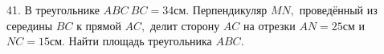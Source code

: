 41. В треугольнике $ABC\ BC=34$см. Перпендикуляр $MN,$ проведённый из середины $BC$ к прямой $AC,$ делит сторону $AC$ на отрезки $AN=25$см и $NC=15$см. Найти площадь треугольника $ABC.$\\
